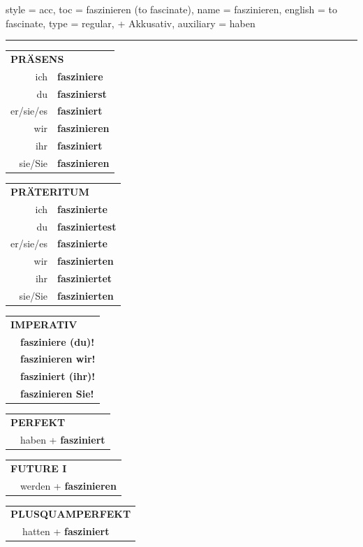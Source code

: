 \begin{verbentry}{
  style = {acc},
  toc = {faszinieren (to fascinate)},
  name = {faszinieren},
  english = {to fascinate},
  type = {regular, + Akkusativ},
  auxiliary = {haben}
}


\vspace{5pt}
\hrule
\vspace{5pt}

\begin{tabular}{rl}
\multicolumn{2}{l}{\textbf{PRÄSENS}}\\
ich & \textbf{fasziniere}\\
du & \textbf{faszinierst}\\
er/sie/es & \textbf{fasziniert}\\
wir & \textbf{faszinieren}\\
ihr & \textbf{fasziniert}\\
sie/Sie & \textbf{faszinieren}\\
\end{tabular}
\hfill
\begin{tabular}{rl}
\multicolumn{2}{l}{\textbf{PRÄTERITUM}}\\
ich & \textbf{faszinierte}\\
du & \textbf{fasziniertest}\\
er/sie/es & \textbf{faszinierte}\\
wir & \textbf{faszinierten}\\
ihr & \textbf{fasziniertet}\\
sie/Sie & \textbf{faszinierten}\\
\end{tabular}
\hfill
\begin{tabular}{rl}
\multicolumn{2}{l}{\textbf{IMPERATIV}}\\
& \textbf{fasziniere (du)!}\\
& \textbf{faszinieren wir!}\\
& \textbf{fasziniert (ihr)!}\\
& \textbf{faszinieren Sie!}\\
\end{tabular}

\vspace{10pt}

\begin{tabular}{rl}
\multicolumn{2}{l}{\textbf{PERFEKT}}\\
& haben + \textbf{fasziniert}\\
\end{tabular}
\hfill
\begin{tabular}{rl}
\multicolumn{2}{l}{\textbf{FUTURE I}}\\
& werden + \textbf{faszinieren}\\
\end{tabular}
\hfill
\begin{tabular}{rl}
\multicolumn{2}{l}{\textbf{PLUSQUAMPERFEKT}}\\
& hatten + \textbf{fasziniert}\\
\end{tabular}


\end{verbentry}
